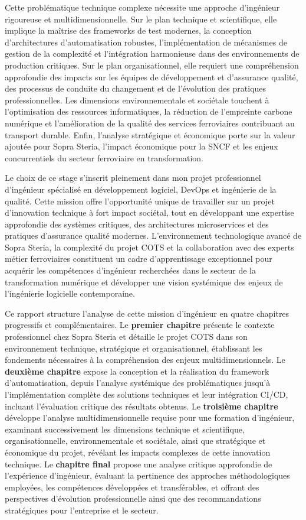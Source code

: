 Cette problématique technique complexe nécessite une approche d'ingénieur rigoureuse et multidimensionnelle. Sur le plan technique et scientifique, elle implique la maîtrise des frameworks de test modernes, la conception d'architectures d'automatisation robustes, l'implémentation de mécanismes de gestion de la complexité et l'intégration harmonieuse dans des environnements de production critiques. Sur le plan organisationnel, elle requiert une compréhension approfondie des impacts sur les équipes de développement et d'assurance qualité, des processus de conduite du changement et de l'évolution des pratiques professionnelles. Les dimensions environnementale et sociétale touchent à l'optimisation des ressources informatiques, la réduction de l'empreinte carbone numérique et l'amélioration de la qualité des services ferroviaires contribuant au transport durable. Enfin, l'analyse stratégique et économique porte sur la valeur ajoutée pour Sopra Steria, l'impact économique pour la SNCF et les enjeux concurrentiels du secteur ferroviaire en transformation.

Le choix de ce stage s'inscrit pleinement dans mon projet professionnel d'ingénieur spécialisé en développement logiciel, DevOps et ingénierie de la qualité. Cette mission offre l'opportunité unique de travailler sur un projet d'innovation technique à fort impact sociétal, tout en développant une expertise approfondie des systèmes critiques, des architectures microservices et des pratiques d'assurance qualité modernes. L'environnement technologique avancé de Sopra Steria, la complexité du projet COTS et la collaboration avec des experts métier ferroviaires constituent un cadre d'apprentissage exceptionnel pour acquérir les compétences d'ingénieur recherchées dans le secteur de la transformation numérique et développer une vision systémique des enjeux de l'ingénierie logicielle contemporaine.

Ce rapport structure l'analyse de cette mission d'ingénieur en quatre chapitres progressifs et complémentaires. Le \textbf{premier chapitre} présente le contexte professionnel chez Sopra Steria et détaille le projet COTS dans son environnement technique, stratégique et organisationnel, établissant les fondements nécessaires à la compréhension des enjeux multidimensionnels. Le \textbf{deuxième chapitre} expose la conception et la réalisation du framework d'automatisation, depuis l'analyse systémique des problématiques jusqu'à l'implémentation complète des solutions techniques et leur intégration CI/CD, incluant l'évaluation critique des résultats obtenus. Le \textbf{troisième chapitre} développe l'analyse multidimensionnelle requise pour une formation d'ingénieur, examinant successivement les dimensions technique et scientifique, organisationnelle, environnementale et sociétale, ainsi que stratégique et économique du projet, révélant les impacts complexes de cette innovation technique. Le \textbf{chapitre final} propose une analyse critique approfondie de l'expérience d'ingénieur, évaluant la pertinence des approches méthodologiques employées, les compétences développées et transférables, et offrant des perspectives d'évolution professionnelle ainsi que des recommandations stratégiques pour l'entreprise et le secteur.